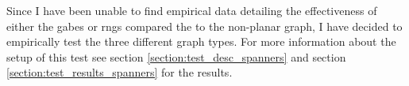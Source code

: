 Since I have been unable to find empirical data detailing the effectiveness of either the \acp{gabe} or \acp{rng} compared the to the non-planar graph, I have decided to empirically test the three different graph types. For more information about the setup of this test see section \ref{section:test_desc_spanners} and section \ref{section:test_results_spanners} for the results.
